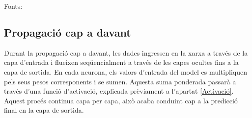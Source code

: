 Fonts: \cite{IMB_Xarxa_neuronal}

\subsection{Propagació cap a davant}\label{subsec:propagació}
Durant la propagació cap a davant, les dades ingressen en la xarxa a través de la capa d'entrada i flueixen seqüencialment a través de les capes ocultes fins a la capa de sortida. En cada neurona, els valors d'entrada del model es multipliquen pels seus pesos corresponents i se sumen. Aquesta suma ponderada passarà a través d'una funció d'activació, explicada prèviament a l'apartat \ref{Activació}. Aquest procés continua capa per capa, això acaba conduint cap a la predicció final en la capa de sortida.

